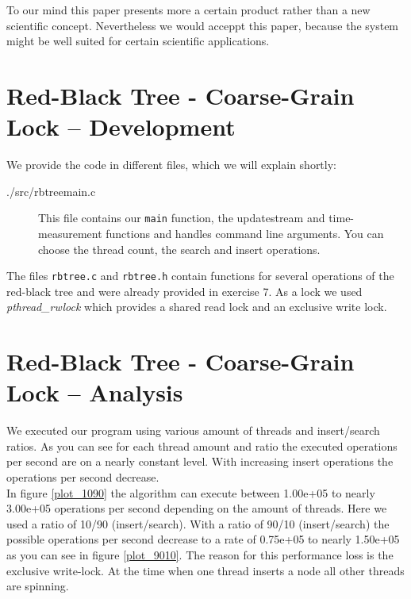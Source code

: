 \documentclass[oneside,a4paper]{scrartcl}
\begin{document}
To our mind this paper presents more a certain product rather than a new scientific
concept. Nevertheless we would acceppt this paper, because the system might be
well suited for certain scientific applications.


\section*{Red-Black Tree - Coarse-Grain Lock -- Development}
\label{dev}
We provide the code in different files, which we will explain shortly:
\begin{description}
    \item[./src/rbtreemain.c] This file contains our \texttt{main} function, the updatestream and 
				time-measurement functions and handles command line arguments. 
				You can choose the thread count, the search and insert operations.

\end{description}
The files \texttt{rbtree.c} and \texttt{rbtree.h} contain functions for several operations of the red-black
tree and were already provided in exercise 7.
As a lock we used \emph{pthread\_rwlock} which provides a shared read lock and an exclusive write lock.

\section*{Red-Black Tree - Coarse-Grain Lock -- Analysis}
We executed our program using various amount of threads and insert/search ratios. As you can see for each 
thread amount and ratio the executed operations per second are on a nearly constant level.  With increasing
insert operations the operations per second decrease. \\
 In figure \ref{plot_1090} the algorithm can execute between 1.00e+05 to nearly 3.00e+05 operations per second 
depending on the amount of threads. Here we used a ratio of 10/90 (insert/search). With a ratio of 90/10 (insert/search)
the possible operations per second decrease to a rate of 0.75e+05 to nearly 1.50e+05 as you can see in figure 
\ref{plot_9010}. The reason for this performance loss is the exclusive write-lock. At the time when one thread inserts a
node all other threads are spinning. 
    
\end{document}
